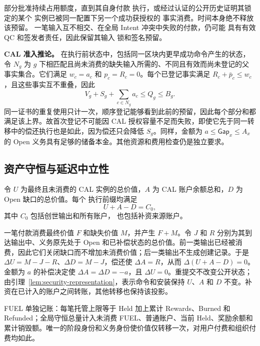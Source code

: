 部分批准持续占用额度，直到其自身付款
执行，或经过认证的公开历史证明其锁定的某个
实例已被同一配置下另一个成功获授权的
事实消费。时间本身绝不释放该预留。
一笔输入互不相交、在全局 Intent 冲突中失败的付款，仍可能
具有有效 QC 和签发者责任，因此保留其输入
锁和签名预留。

\noindent\textbf{CAL 准入推论。}
在执行前状态中，包括同一区块内更早成功命令产生的状态，令 $N_g$ 为 $g$ 下相匹配且尚未消费的缺失输入所需的、不同且有效而尚未登记的父事实集合。它们满足 $w_c=a_c$ 和 $p_c=R_c=0$。每个已登记事实满足 $R_c+\bar p_c\le w_c$，且这些事实互不重叠，因此
\begin{equation}
 V_g+S_g+\sum_{c\in N_g}a_c\le Q_g\le B_g.
 \label{eq:security-admission}
\end{equation}
同一证书的重复使用只计一次，顺序登记能够看到此前的预留，因此每个部分和都满足该上界。故首次登记不可能因 CAL 授权容量不足而失败，即使它先于同一转移中的偿还执行也是如此，因为偿还只会降低 $S_g$。同样，金额为 $a\le\mathsf{Gap}_x\le A_x$ 的 Open 义务具有足够的储备本金。其他资源和费用检查仍是独立要求。

\subsection{资产守恒与延迟中立性}
\label{sec:security-conservation}

\begin{theorem}[CAL 守恒]
\label{thm:security-conservation}
令 $U$ 为最终且未消费的 CAL 实例的总价值，$A$ 为
CAL 账户余额总和，$D$ 为 Open 缺口的总价值。每个
执行前缀均满足
\begin{equation}
 U+A-D=C_0,
 \label{eq:security-conservation}
\end{equation}
其中 $C_0$ 包括创世输出和所有账户，
也包括补资来源账户。
\end{theorem}
\begin{IEEEproof}
一笔付款消费最终价值 $F$ 和缺失价值 $M$，并产生 $F+M$。令 $J$ 和 $R$ 分别为其到达输出中、义务原先处于 Open 和已补偿状态的总价值。前一类输出已经被消费，因此它们关闭缺口而不增加未消费价值；后一类输出不生成创建记录。于是 $\Delta U=M-J-R$、$\Delta D=M-J$，偿还使 $\Delta A=R$，从而 $\Delta(U+A-D)=0$。金额为 $a$ 的补偿决定使 $\Delta A=\Delta D=-a$，且 $\Delta U=0$。重提交不改变公开状态；由引理~\ref{lem:security-representation}，表示命令和安装保持 $U$、$A$ 和 $D$ 不变。补资在已计入的账户之间转账，其他转移也保持该投影。
\end{IEEEproof}

FUEL 单独记账：每笔托管上限等于 Held 加上累计 Rewards、Burned 和 Refunded；全局守恒总量计入未消费 FUEL、普通账户、当前 Held、奖励余额和累计销毁额。唯一的阶段身份和义务身份使价值仅转移一次，对用户付费和组织付费均如此。

